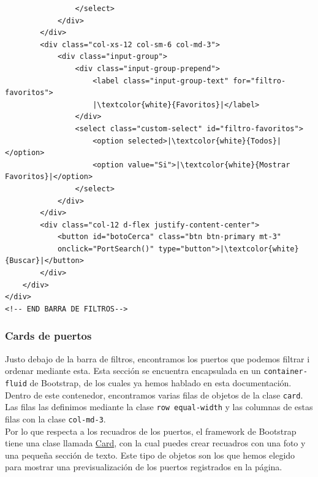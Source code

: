 \documentclass{article}
\begin{document}
\begin{verbatim}
                </select>
            </div>
        </div>
        <div class="col-xs-12 col-sm-6 col-md-3">
            <div class="input-group">
                <div class="input-group-prepend">
                    <label class="input-group-text" for="filtro-favoritos">
                    |\textcolor{white}{Favoritos}|</label>
                </div>
                <select class="custom-select" id="filtro-favoritos">
                    <option selected>|\textcolor{white}{Todos}|</option>
                    <option value="Si">|\textcolor{white}{Mostrar Favoritos}|</option>
                </select>
            </div>
        </div>
        <div class="col-12 d-flex justify-content-center">
            <button id="botoCerca" class="btn btn-primary mt-3" 
            onclick="PortSearch()" type="button">|\textcolor{white}{Buscar}|</button>
        </div>
    </div>
</div>
<!-- END BARRA DE FILTROS-->
\end{verbatim}

\subsubsection{Cards de puertos}
Justo debajo de la barra de filtros, encontramos los puertos que podemos filtrar i ordenar mediante esta. Esta sección se encuentra encapsulada en un \texttt{container-fluid} de Bootstrap, de los cuales ya hemos hablado en esta documentación. Dentro de este contenedor, encontramos varias filas de objetos de la clase \texttt{card}. Las filas las definimos mediante la clase \texttt{row equal-width} y las columnas de estas filas con la clase \texttt{col-md-3}.\\

\noindent Por lo que respecta a los recuadros de los puertos, el framework de Bootstrap tiene una clase llamada \href{https://getbootstrap.com/docs/5.3/components/card/}{Card}, con la cual puedes crear recuadros con una foto y una pequeña sección de texto. Este tipo de objetos son los que hemos elegido para mostrar una previsualización de los puertos registrados en la página.\\
\end{document}

